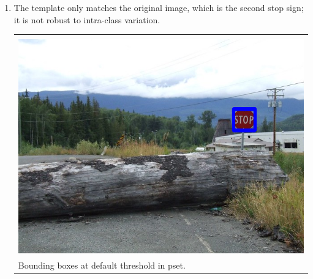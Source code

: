 \documentclass{article}
\begin{document}
\begin{enumerate}[label=(\roman*)]
\pagebreak

\item %
The template only matches the original image, which is the second stop sign; it is not robust to intra-class variation.

\begin{tabular}[t]{l}
	\hline \\
	\includegraphics[width=1.0\textwidth]{img/stop2_detection.png} \\
	Bounding boxes at default threshold in pset. \\
	\hline
\end{tabular}

\end{enumerate}
\end{document}
